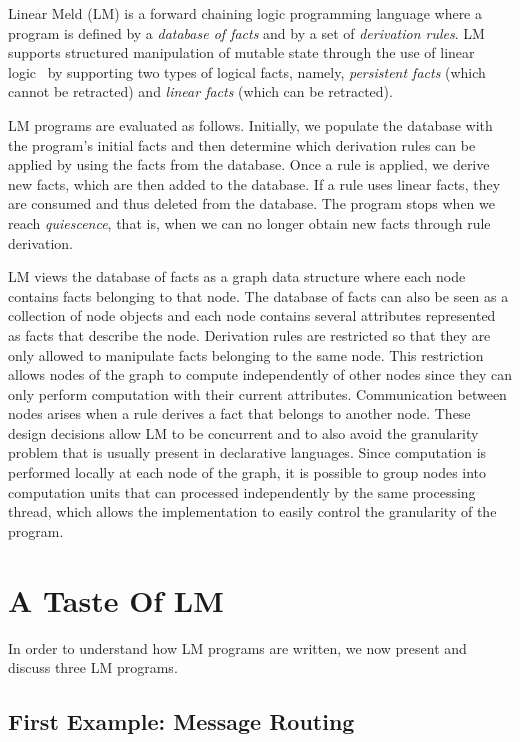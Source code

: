 
Linear Meld (LM) is a forward chaining logic programming language where a
program is defined by a \emph{database of facts} and by a set of
\emph{derivation rules}. LM supports structured manipulation of mutable state
through the use of linear logic~\cite{girard-87} by supporting two types of
logical facts, namely, \emph{persistent facts} (which cannot be retracted) and
\emph{linear facts} (which can be retracted).

LM programs are evaluated as follows. Initially, we populate the database with
the program's initial facts and then determine which derivation rules can be
applied by using the facts from the database. Once a rule is applied, we derive
new facts, which are then added to the database. If a rule uses linear facts,
they are consumed and thus deleted from the database. The program stops when we
reach \emph{quiescence}, that is, when we can no longer obtain new facts through
rule derivation.

LM views the database of facts as a graph data structure where each node contains
facts belonging to that node. The database of facts can also be seen as a
collection of node objects and each node contains several attributes represented
as facts that describe the node. Derivation rules are restricted so that they
are only allowed to manipulate facts belonging to the same node. This
restriction allows nodes of the graph to compute independently of other nodes
since they can only perform computation with their current attributes.
Communication between nodes arises when a rule derives a fact that belongs to
another node. These design decisions allow LM to be concurrent and to also avoid
the granularity problem that is usually present in declarative languages. Since
computation is performed locally at each node of the graph, it is possible to
group nodes into computation units that can processed independently by the same
processing thread, which allows the implementation to easily control the
granularity of the program.

\section{A Taste Of LM}

In order to understand how LM programs are written, we now present and discuss
three LM programs.

\subsection{First Example: Message Routing}\label{section:language:message}


